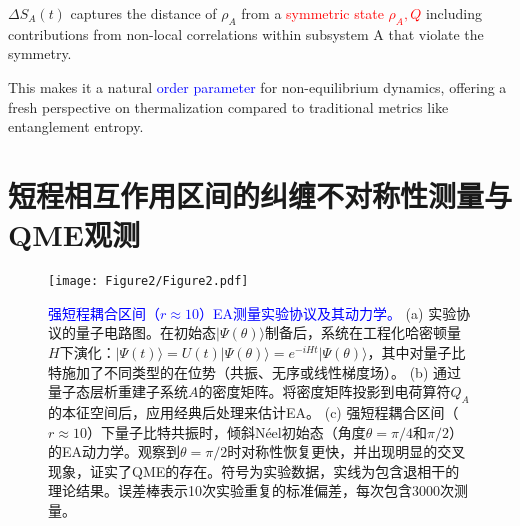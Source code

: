 \documentclass[11pt,a4paper]{article}
\begin{document}
$\Delta S_A(t)$ captures the distance of $\rho_A$ from a \textcolor{red}{symmetric state $\rho_A,Q$} including contributions from non-local correlations within subsystem A that violate the symmetry.

This makes it a natural \textcolor{blue}{order parameter} for non-equilibrium dynamics, offering a fresh perspective on thermalization compared to traditional metrics like entanglement entropy.



\section{短程相互作用区间的纠缠不对称性测量与QME观测}

\begin{figure}[H]
    \centering
    \texttt{[image: Figure2/Figure2.pdf]}
    \caption{
        \textcolor{blue}{强短程耦合区间（$r\approx 10$）EA测量实验协议及其动力学。}
        (a) 实验协议的量子电路图。在初始态$|\Psi(\theta)\rangle$制备后，系统在工程化哈密顿量$H$下演化：$|\Psi(t)\rangle = U(t)|\Psi(\theta)\rangle = e^{-iHt}|\Psi(\theta)\rangle$，其中对量子比特施加了不同类型的在位势（共振、无序或线性梯度场）。
        (b) 通过量子态层析重建子系统$A$的密度矩阵。将密度矩阵投影到电荷算符$Q_A$的本征空间后，应用经典后处理来估计EA。
        (c) 强短程耦合区间（$r\approx 10$）下量子比特共振时，倾斜Néel初始态（角度$\theta=\pi/4$和$\pi/2$）的EA动力学。观察到$\theta=\pi/2$时对称性恢复更快，并出现明显的交叉现象，证实了QME的存在。符号为实验数据，实线为包含退相干的理论结果。误差棒表示10次实验重复的标准偏差，每次包含3000次测量。
    }
    \label{fig:EA_measurement_strong_coupling}
\end{figure}
\end{document}
